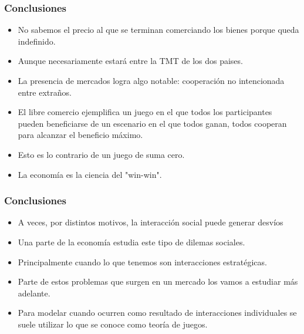 \documentclass{beamer}
\begin{document}
\begin{frame}
    \frametitle{Conclusiones}
    \begin{itemize}
        \item No sabemos el precio al que se terminan comerciando los bienes porque queda indefinido.
        \item Aunque necesariamente estará entre la TMT de los dos paises.
        \item La presencia de mercados logra algo notable: cooperación no intencionada entre extraños.
        \item El libre comercio ejemplifica un juego en el que todos los participantes pueden beneficiarse de un escenario en el que todos ganan, todos cooperan para alcanzar el beneficio máximo.
        \item Esto es lo contrario de un juego de suma cero.
        \item La economía es la ciencia del "win-win".
    \end{itemize}
\end{frame}

\begin{frame}
    \frametitle{Conclusiones}
    \begin{itemize}
        \item A veces, por distintos motivos, la interacción social puede generar desvíos
        \item Una parte de la economía estudia este tipo de dilemas sociales.
        \item Principalmente cuando lo que tenemos son interacciones estratégicas.
        \item Parte de estos problemas que surgen en un mercado los vamos a estudiar más adelante.
        \item Para modelar cuando ocurren como resultado de interacciones individuales se suele utilizar lo que se conoce como teoría de juegos.
    \end{itemize}
\end{frame}
\end{document}
